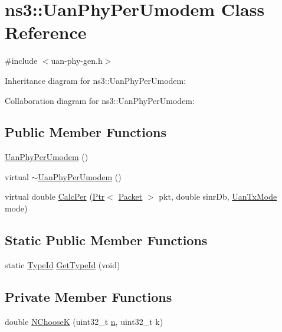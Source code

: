 \hypertarget{classns3_1_1UanPhyPerUmodem}{}\section{ns3\+:\+:Uan\+Phy\+Per\+Umodem Class Reference}
\label{classns3_1_1UanPhyPerUmodem}


{\ttfamily \#include $<$uan-\/phy-\/gen.\+h$>$}



Inheritance diagram for ns3\+:\+:Uan\+Phy\+Per\+Umodem\+:


Collaboration diagram for ns3\+:\+:Uan\+Phy\+Per\+Umodem\+:
\subsection*{Public Member Functions}
\begin{DoxyCompactItemize}
\item 
\hyperlink{classns3_1_1UanPhyPerUmodem_ab81f8659d42e9d845004d1bb2745124d}{Uan\+Phy\+Per\+Umodem} ()
\item 
virtual \hyperlink{classns3_1_1UanPhyPerUmodem_ae8a5beefb575ef6e33f578dabc223e58}{$\sim$\+Uan\+Phy\+Per\+Umodem} ()
\item 
virtual double \hyperlink{classns3_1_1UanPhyPerUmodem_a9a6f46eb34ec23e1492d2a53b701cfff}{Calc\+Per} (\hyperlink{classns3_1_1Ptr}{Ptr}$<$ \hyperlink{classns3_1_1Packet}{Packet} $>$ pkt, double sinr\+Db, \hyperlink{classns3_1_1UanTxMode}{Uan\+Tx\+Mode} mode)
\end{DoxyCompactItemize}
\subsection*{Static Public Member Functions}
\begin{DoxyCompactItemize}
\item 
static \hyperlink{classns3_1_1TypeId}{Type\+Id} \hyperlink{classns3_1_1UanPhyPerUmodem_a1c53fffcff18ee0aa75f373d0fd90b91}{Get\+Type\+Id} (void)
\end{DoxyCompactItemize}
\subsection*{Private Member Functions}
\begin{DoxyCompactItemize}
\item 
double \hyperlink{classns3_1_1UanPhyPerUmodem_aa76cc90b685b1bf88a1ecbc76f9c229d}{N\+ChooseK} (uint32\+\_\+t \hyperlink{lte__link__budget__x2__handover__measures_8m_abdb05bc5a064cf642a06c83b3392f148}{n}, uint32\+\_\+t k)
\end{DoxyCompactItemize}
